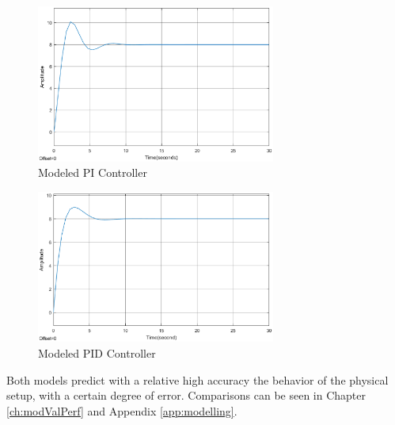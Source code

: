 \begin{figure}[ht]
	\centering
	\includegraphics[width=0.7\textwidth]{figures/06ModelValidation/modelPI.eps}
	\caption{Modeled PI Controller}
	\label{fig:modeledPI}
\end{figure}
\vspace{-5mm}
\begin{figure}[ht]
	\centering
	\includegraphics[width=0.7\textwidth]{figures/06ModelValidation/modelPID.eps}
	\caption{Modeled PID Controller}
	\label{fig:modeledPID}
\end{figure}

Both models predict with a relative high accuracy the  behavior of the physical setup, 
with a certain degree of error. Comparisons can be seen in Chapter \ref{ch:modValPerf} and Appendix \ref{app:modelling}.